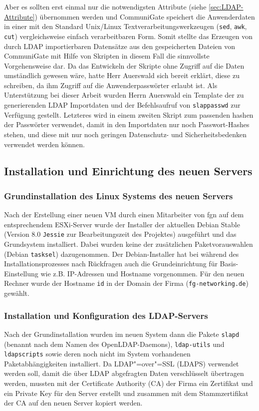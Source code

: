 \documentclass[11pt,a4paper,titlepage=firstiscover,headsepline,bibtotoc]{scrartcl} %
\begin{document}
Aber es sollten erst einmal nur die notwendigsten Attribute (siehe \autoref{sec:LDAP-Attribute}) übernommen werden und CommuniGate speichert die Anwenderdaten in einer mit den Standard Unix/Linux Textverarbeitungswerkzeugen (\texttt{sed}, \texttt{awk}, \texttt{cut}) vergleichsweise einfach verarbeitbaren Form. Somit stellte das Erzeugen von durch LDAP importierbaren Datensätze aus den gespeicherten Dateien von CommuniGate mit Hilfe von Skripten in diesem Fall die sinnvollste Vorgehensweise dar. Da das Entwickeln der Skripte ohne Zugriff auf die Daten umständlich gewesen wäre, hatte Herr Auerswald sich bereit erklärt, diese zu schreiben, da ihm Zugriff auf die Anwenderpasswörter erlaubt ist. Als Unterstützung bei dieser Arbeit wurden Herrn Auerswald ein Template der zu generierenden LDAP Importdaten und der Befehlsaufruf von \texttt{slappasswd} zur Verfügung gestellt. Letzteres wird in einem zweiten Skript zum passenden hashen der Passwörter verwendet, damit in den Importdaten nur noch Passwort-Hashes stehen, und diese mit nur noch geringen Datenschutz- und Sicherheitsbedenken verwendet werden können.

\subsection{Installation und Einrichtung des neuen Servers}
\subsubsection{Grundinstallation des Linux Systems des neuen Servers}
Nach der Erstellung einer neuen VM durch einen Mitarbeiter von fgn auf dem entsprechendem ESXi-Server wurde der Installer der aktuellen Debian Stable (Version 8.0 \texttt{Jessie} zur Bearbeitungszeit des Projektes) ausgeführt und das Grundsystem installiert. Dabei wurden keine der zusätzlichen Paketvorauswahlen (Debian \texttt{tasksel}) dazugenommen.  Der Debian-Installer hat bei während des Installationsprozesses nach Rückfragen auch die Grundeinrichtung für Basis-Einstellung wie z.B. IP-Adressen und Hostname vorgenommen. Für den neuen Rechner wurde der Hostname \texttt{id} in der Domain der Firma (\texttt{fg-networking.de}) gewählt.

\subsubsection{Installation und Konfiguration des LDAP-Servers}
Nach der Grundinstallation wurden im neuen System dann die Pakete \texttt{slapd} (benannt nach dem Namen des OpenLDAP-Daemons), \texttt{ldap-utils} und \texttt{ldapscripts} sowie deren noch nicht im System vorhandenen Paketabhängigkeiten installiert. Da LDAP"=over"=SSL (LDAPS) verwendet werden soll, damit die über LDAP abgefragten Daten verschlüsselt übertragen werden, mussten mit der Certificate Authority (CA) der Firma ein Zertifikat und ein Private Key für den Server erstellt und zusammen mit dem Stammzertifikat der CA auf den neuen Server kopiert werden.
\end{document}
